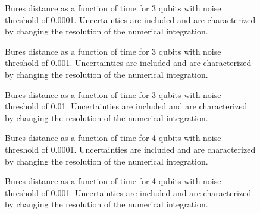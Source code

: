 \pagebreak

\begin{figure}[h]
\begin{center}
\end{center}
\caption{Bures distance as a function of time for 3 qubits with noise
threshold of 0.0001.  Uncertainties are included and are characterized 
by changing the resolution of the numerical integration.}
\end{figure}

\pagebreak

\begin{figure}[h]
\begin{center}
\end{center}
\caption{Bures distance as a function of time for 3 qubits with noise
threshold of 0.001.  Uncertainties are included and are characterized 
by changing the resolution of the numerical integration.}
\end{figure}

\pagebreak

\begin{figure}[h]
\begin{center}
\end{center}
\caption{Bures distance as a function of time for 3 qubits with noise
threshold of 0.01.  Uncertainties are included and are characterized 
by changing the resolution of the numerical integration.}
\end{figure}

\pagebreak

\begin{figure}[h]
\begin{center}
\end{center}
\caption{Bures distance as a function of time for 4 qubits with noise
threshold of 0.0001.  Uncertainties are included and are characterized 
by changing the resolution of the numerical integration.}
\end{figure}

\pagebreak

\begin{figure}[h]
\begin{center}
\end{center}
\caption{Bures distance as a function of time for 4 qubits with noise
threshold of 0.001.  Uncertainties are included and are characterized 
by changing the resolution of the numerical integration.}
\end{figure}

